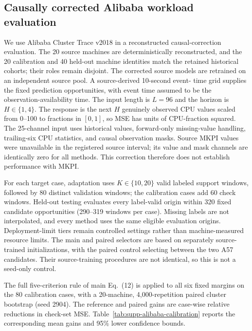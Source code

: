 \documentclass[11pt,a4paper]{article}
\begin{document}
\subsection{Causally corrected Alibaba workload evaluation}

We use Alibaba Cluster Trace v2018 in a reconstructed causal-correction
evaluation. The 20 source machines are deterministically reconstructed, and
the 20 calibration and 40 held-out machine identities match the retained
historical cohorts; their roles remain disjoint. The corrected source models
are retrained on an independent source pool. A source-derived 10-second event-
time grid supplies the fixed prediction opportunities, with event time assumed
to be the observation-availability time. The input length is $L=96$ and the
horizon is $H\in\{1,4\}$. The response is the next $H$ genuinely observed
CPU values scaled from 0--100 to fractions in $[0,1]$, so MSE has units of
CPU-fraction squared. The 25-channel input uses historical values,
forward-only missing-value handling, trailing-six CPU statistics, and causal
observation masks. Source MKPI values were unavailable in the registered
source interval; its value and mask channels are identically zero for all
methods. This correction therefore does not establish performance with MKPI.

For each target case, adaptation uses $K\in\{10,20\}$ valid labeled support
windows, followed by 80 distinct validation windows; the calibration cases
add 60 check windows. Held-out testing evaluates every label-valid origin
within 320 fixed candidate opportunities (290--319 windows per case).
Missing labels are not interpolated, and every method uses the same eligible
evaluation origins. Deployment-limit tiers remain controlled settings rather
than machine-measured resource limits. The main and paired selectors are
based on separately source-trained initializations, with the paired control
selecting between the two A57 candidates. Their source-training procedures
are not identical, so this is not a seed-only control.

The full five-criterion rule of main Eq.~(12) is applied to all six fixed
margins on the 80 calibration cases, with a 20-machine, 4,000-repetition
paired cluster bootstrap (seed 2904). The reference and paired gains are
case-wise relative reductions in check-set MSE. Table~\ref{tab:supp-alibaba-calibration}
reports the corresponding mean gains and 95\% lower confidence bounds.
\end{document}
